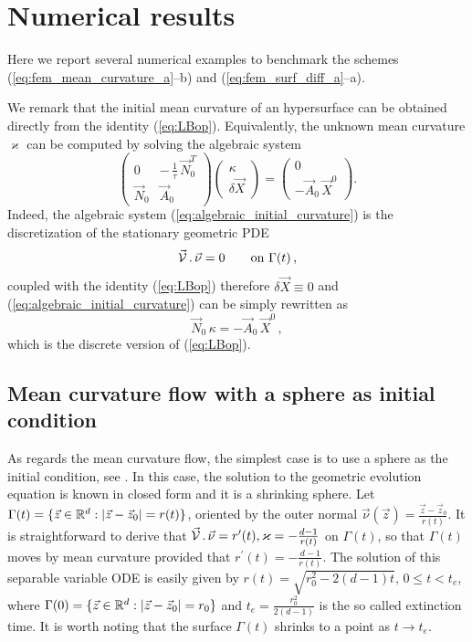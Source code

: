 \section{Numerical results}\label{sec:geometric_pdes_results}
Here we report several numerical examples to benchmark the schemes
(\ref{eq:fem_mean_curvature_a}--b) and (\ref{eq:fem_surf_diff_a}--a).

We remark that the initial mean curvature of an hypersurface can be obtained
directly from the identity (\ref{eq:LBop}). Equivalently, the unknown
mean curvature $\varkappa$ can be computed by solving the algebraic system
\begin{equation}\label{eq:algebraic_initial_curvature}
\begin{pmatrix}
0 & -\,\frac{1}{\tau} \, \vec{N}_{0}^{T} \\
\vec{N}_0 & \vec{A}_0
\end{pmatrix}
\begin{pmatrix}
\kappa \\
\delta \vec X
\end{pmatrix}
=
\begin{pmatrix}
0 \\
- \vec{A}_0 \, \vec{X}^{0}
\end{pmatrix}
.
\end{equation}
Indeed, the algebraic system (\ref{eq:algebraic_initial_curvature}) is the
discretization of the stationary geometric PDE
\begin{equation}
\vec{\mathcal{V}}\,.\,\vec\nu=0\qquad\mbox{on }\Gamma(t)\,,
\end{equation}
coupled with the identity (\ref{eq:LBop}) therefore $\delta\vec X \equiv 0$ and
(\ref{eq:algebraic_initial_curvature}) can be simply rewritten as
\begin{equation}
\vec{N}_0\,\kappa=- \vec{A}_0 \, \vec{X}^{0}\,,
\end{equation}
which is the discrete version of (\ref{eq:LBop}).

\subsection{Mean curvature flow with a sphere as initial condition}
\label{subsec:mc_sphere}
As regards the mean curvature flow, the simplest case is to use a sphere as the
initial condition, see \cite{Ilmanen98}. In this case, the solution to the
geometric evolution equation is known in closed form and it is a shrinking
sphere. Let $\Gamma(t) = \{ \vec z \in {\mathbb R}^d : |\vec z -\vec z_0| = r(t) \}$,
oriented by the outer normal $\vec \nu(\vec{z}) = \frac{\vec z - \vec
z_0}{r(t)}$. It is straightforward to derive that
$\vec{\mathcal{V}}\,.\,\vec\nu = r^{\prime}(t), \varkappa = - \frac{d -
1}{r(t)}$ on $\Gamma(t)$, so that $\Gamma(t)$ moves by mean curvature provided
that $r^{\prime}(t) = - \frac{d - 1}{r(t)}$. The solution of this separable
variable ODE is easily given by $r(t) = \sqrt{r_0^2 - 2(d - 1)t}, \, 0 \leq t <
t_e$, where $\Gamma(0) = \{ \vec z \in {\mathbb R}^d : |\vec z -\vec z_0| = r_0 \}$ and
$t_e=\frac{r_0^2}{2(d - 1)}$ is the so called extinction time. It is worth
noting that the surface $\Gamma(t)$ shrinks to a point as $t \rightarrow t_e$.

